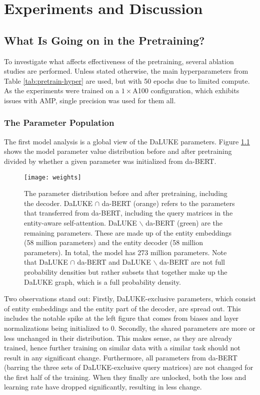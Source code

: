 \documentclass[main.tex]{subfiles}
\begin{document}
\chapter{Experiments and Discussion}
\label{chap:discussion}

\section{What Is Going on in the Pretraining?}
\label{sec:pretrainpls}
To investigate what affects effectiveness of the pretraining, several ablation studies are performed.
Unless stated otherwise, the main hyperparameters from Table \ref{tab:pretrain-hyper} are used, but with 50 epochs due to limited compute.
As the experiments were trained on a $ 1\times$A100 configuration, which exhibits issues with AMP, single precision was used for them all.

\subsection{The Parameter Population}
The first model analysis is a global view of the DaLUKE parameters.
Figure \ref{fig:weight-dist} shows the model parameter value distribution before and after pretraining divided by whether a given parameter was initialized from da-BERT.
\begin{figure}[H]
    \centering
    \texttt{[image: weights]}
    \caption{
        The parameter distribution before and after pretraining, including the decoder.
        DaLUKE $ \cap $ da-BERT (orange) refers to the parameters that transferred from da-BERT, including the query matrices in the entity-aware self-attention.
        DaLUKE $ \backslash $ da-BERT (green) are the remaining parameters.
        These are made up of the entity embeddings (58 million parameters) and the entity decoder (58 million parameters).
        In total, the model has 273 million parameters.
        Note that DaLUKE $ \cap $ da-BERT and DaLUKE $ \backslash $ da-BERT are not full probability densities but rather subsets that together make up the DaLUKE graph, which is a full probability density.
    }
    \label{fig:weight-dist}
\end{figure}\noindent
Two observations stand out:
Firstly, DaLUKE-exclusive parameters, which consist of entity embeddings and the entity part of the decoder, are spread out.
This includes the notable spike at the left figure that comes from biases and layer normalizations being initialized to 0.
Secondly, the shared parameters are more or less unchanged in their distribution.
This makes sense, as they are already trained, hence further training on similar data with a similar task should not result in any significant change.
Furthermore, all parameters from da-BERT (barring the three sets of DaLUKE-exclusive query matrices) are not changed for the first half of the training.
When they finally are unlocked, both the loss and learning rate have dropped significantly, resulting in less change.
\end{document}
